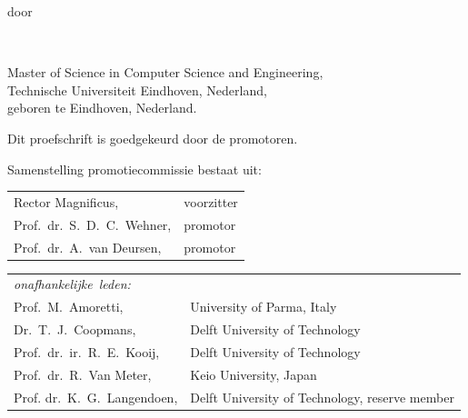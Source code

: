 \begin{titlepage}
\begin{center}
\bigskip
\bigskip

door

\bigskip
\bigskip

\makeatletter
{\Large\titlefont\bfseries\@firstname\ \titleshape{\MakeUppercase{\@lastname}}}
\makeatother

\bigskip
\bigskip

Master of Science in Computer Science and Engineering, \\
Technische Universiteit Eindhoven, Nederland, \\
geboren te Eindhoven, Nederland.

\vspace*{2\bigskipamount}

\end{center}

\clearpage
\thispagestyle{empty}

\noindent
Dit proefschrift is goedgekeurd door de promotoren.

\bigskip\noindent
Samenstelling promotiecommissie bestaat uit:

\medskip\noindent
\begin{tabular}{p{4.5cm}l}
    Rector Magnificus, & voorzitter \\
    Prof.\ dr.\ S.\ D.\ C.\ Wehner, & promotor \\
    Prof.\ dr.\ A.\ van Deursen, & promotor \\
\end{tabular}

\medskip\noindent
\begin{tabular}{p{4.5cm}l}
    \mbox{\emph{onafhankelijke leden:}} & \\
    Prof.\ M.\ Amoretti,                & University of Parma, Italy \\
    Dr.\ T.\ J.\ Coopmans,              & Delft University of Technology \\
    Prof.\ dr.\ ir.\ R.\ E.\ Kooij,     & Delft University of Technology \\
    Prof.\ dr.\ R.\ Van Meter,          & Keio University, Japan \\
    Prof. dr.\ K.\ G.\ Langendoen,      & Delft University of Technology, reserve member \\
\end{tabular}


\end{titlepage}
